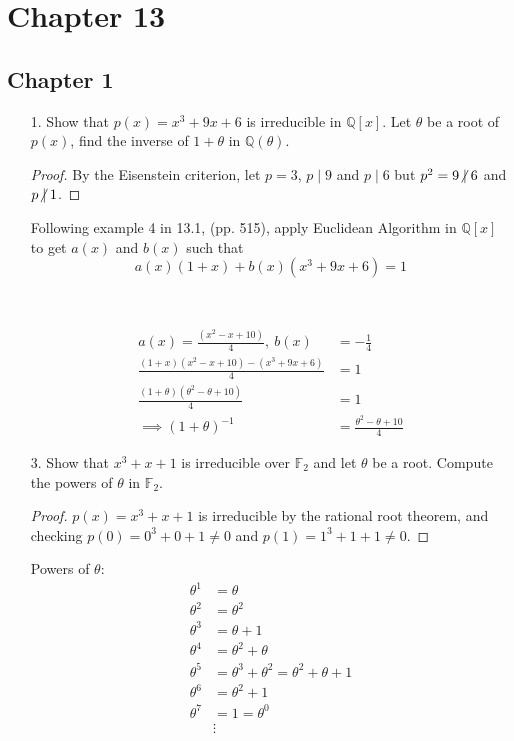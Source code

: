 \documentclass[hidelinks,12pt]{article}
\title{\scalebox{2}{Math 835 Homework 1}}
\author{\scalebox{1.5}{Theo Koss}}
\date{September 2024}
\newcommand{\Q}{\mathbb{Q}}
\newcommand{\F}{\mathbb{F}}
\begin{document}
\maketitle
\section{Chapter 13}
\subsection{Chapter 1}
\begin{enumerate}
	\item[1.] Show that $p(x)=x^3+9x+6$ is irreducible in $\Q[x]$. Let $\theta$ be a root of $p(x)$, find the inverse of $1+\theta$ in $\Q(\theta)$.
		\begin{proof}
			By the Eisenstein criterion, let $p=3$, $p\mid 9$ and $p\mid 6$ but $p^2=9\centernot\mid 6$ and $p\centernot\mid 1$.
		\end{proof}
		Following example 4 in 13.1, (pp. 515), apply Euclidean Algorithm in $\Q[x]$ to get $a(x)$ and $b(x)$ such that \[a(x)(1+x)+b(x)(x^3+9x+6)=1\]
		\begin{centering}{}\\\end{centering}
		\begin{align*}
			a(x)=\frac{(x^2-x+10)}{4},\ b(x)         & =-\frac{1}{4}\tag{Div. both sides by 4} \\
			\frac{(1+x)(x^2-x+10)-(x^3+9x+6)}{4}     & =1                                      \\
			\frac{(1+\theta)(\theta^2-\theta+10)}{4} & =1\tag{Since $p(\theta)=0$}             \\
			\implies (1+\theta)^{-1}                 & =\frac{\theta^2-\theta+10}{4}
		\end{align*}
	\item[3.] Show that $x^3+x+1$ is irreducible over $\F_2$ and let $\theta$ be a root. Compute the powers of $\theta$ in $\F_2$.
		\begin{proof}
			$p(x)=x^3+x+1$ is irreducible by the rational root theorem, and checking $p(0)=0^3+0+1\neq0$ and $p(1)=1^3+1+1\neq0$.
		\end{proof}
		Powers of $\theta$:
		\begin{align*}
			\theta^1 & =\theta                              \\
			\theta^2 & =\theta^2                            \\
			\theta^3 & =\theta+1                            \\
			\theta^4 & =\theta^2+\theta                     \\
			\theta^5 & =\theta^3+\theta^2=\theta^2+\theta+1 \\
			\theta^6 & =\theta^2+1                          \\
			\theta^7 & =1=\theta^0                          \\
			         & \vdots                               \\
		\end{align*}
\end{enumerate}
\end{document}

